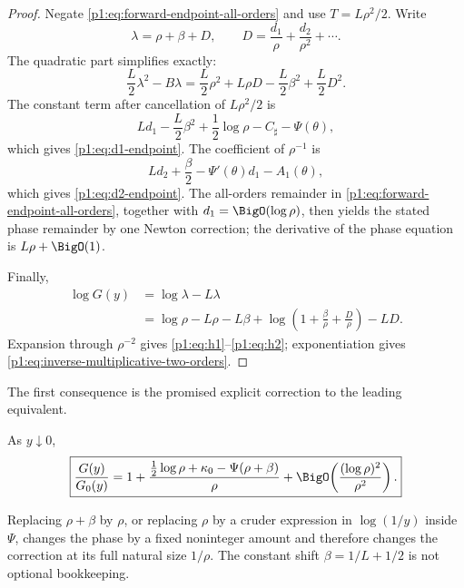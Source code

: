 \documentclass[11pt,oneside]{article}
\numberwithin{equation}{section}
\theoremstyle{definition}
\theoremstyle{remark}
\begin{document}
\begin{proof}
Negate \eqref{p1:eq:forward-endpoint-all-orders} and use
$T=L\rho^2/2$.  Write
\begin{equation}
 \lambda=\rho+\beta+D,
 \qquad
 D=\frac{d_1}{\rho}+\frac{d_2}{\rho^2}+\cdots.
 \label{p1:eq:lambda-D}
\end{equation}
The quadratic part simplifies exactly:
\begin{equation}
 \frac L2\lambda^2-B\lambda
 =\frac L2\rho^2+L\rho D-\frac L2\beta^2+\frac L2D^2.
 \label{p1:eq:quadratic-cancellation}
\end{equation}
The constant term after cancellation of $L\rho^2/2$ is
\[
 Ld_1-\frac L2\beta^2+\frac12\log\rho-C_{\sharp}-\Psi(\theta),
\]
which gives \eqref{p1:eq:d1-endpoint}.  The coefficient of $\rho^{-1}$ is
\[
 Ld_2+\frac\beta2-\Psi'(\theta)d_1-A_1(\theta),
\]
which gives \eqref{p1:eq:d2-endpoint}.  The all-orders remainder in
\eqref{p1:eq:forward-endpoint-all-orders}, together with $d_1=\BigO(\log\rho)$,
then yields the stated phase remainder by one Newton correction; the derivative of the
phase equation is $L\rho+\BigO(1)$.

Finally,
\begin{align*}
 \log G(y)
 &=\log\lambda-L\lambda\\
 &=\log\rho-L\rho-L\beta
   +\log\!\left(1+\frac\beta\rho+\frac D\rho\right)-LD.
\end{align*}
Expansion through $\rho^{-2}$ gives \eqref{p1:eq:h1}--\eqref{p1:eq:h2}; exponentiation
gives \eqref{p1:eq:inverse-multiplicative-two-orders}.
\end{proof}

The first consequence is the promised explicit correction to the leading equivalent.

\begin{corollary}
\label{p1:cor:first-oscillatory-inverse}
As $y\downarrow0$,
\begin{equation}
 \boxed{
 \frac{G(y)}{G_0(y)}
 =1+\frac{\tfrac12\log\rho+\kappa_0-\Psi(\rho+\beta)}{\rho}
 +\BigO\!\left(\frac{(\log\rho)^2}{\rho^2}\right).}
 \label{p1:eq:first-oscillatory-inverse}
\end{equation}
\end{corollary}

\begin{remark}
Replacing $\rho+\beta$ by $\rho$, or replacing $\rho$ by a cruder expression in
$\log(1/y)$ inside $\Psi$, changes the phase by a fixed noninteger amount and therefore
changes the correction at its full natural size $1/\rho$.  The constant shift
$\beta=1/L+1/2$ is not optional bookkeeping.
\end{remark}
\end{document}
